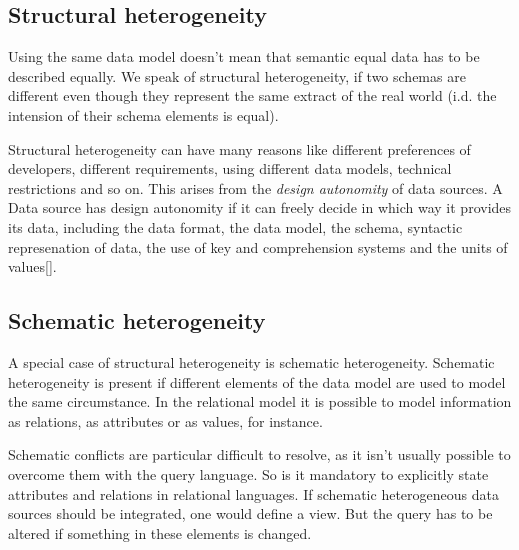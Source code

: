 \subsection{Structural  heterogeneity}
Using the same data model doesn't mean that semantic equal data has to be described equally. We speak of structural heterogeneity, if two schemas are different even though they represent the same extract of the real world (i.d. the intension of their schema elements is equal). 

Structural heterogeneity can have many reasons like different preferences of developers, different requirements, using different data models, technical restrictions and so on. This arises from the \textit{design autonomity} of data sources. A Data source has design autonomity if it can freely decide in which way it provides its data, including the data format, the data model, the schema, syntactic represenation of data, the use of key and comprehension systems and the units of values[\cite[p.55]{DBLP:books/dp/LeserN2006}].

\subsection{Schematic  heterogeneity}
A special case of structural heterogeneity is schematic heterogeneity. Schematic heterogeneity is present if different elements of the data model are used to model the same circumstance. In the relational model it is possible to model information as relations, as attributes or as values, for instance. 

Schematic conflicts are particular difficult to resolve, as it isn't usually possible to overcome them with the query language. So is it mandatory to explicitly state attributes and relations in relational languages. If schematic heterogeneous data sources should be integrated, one would define a view. But the query has to be altered if something in these elements is changed.

